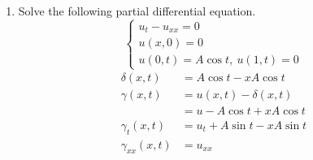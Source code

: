 \documentclass{article}
\begin{document}
\begin{enumerate}
\newpage
\item Solve the following partial differential equation.
\[
\begin{cases*}
u_{t} - u_{xx} = 0\\
u(x,0) = 0\\
u(0,t) = A\cos{t},\ u(1,t) = 0
\end{cases*}
\]
\begin{align*}
\delta(x,t) &= A\cos{t} - xA\cos{t}\\
\gamma(x,t) &= u(x,t) - \delta(x,t)\\
&= u - A\cos{t} + xA\cos{t}\\
\gamma_{t}(x,t) &= u_{t} + A\sin{t} - xA\sin{t}\\
\gamma_{xx}(x,t) &= u_{xx}
\end{align*}
\end{enumerate}
\end{document}
